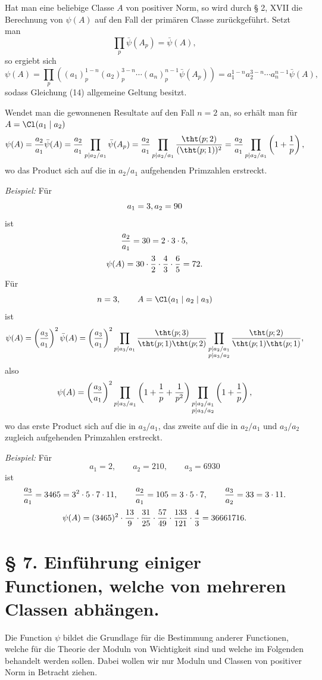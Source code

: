 Hat man eine beliebige Classe $A$ von positiver Norm, so wird durch § 2, XVII die Berechnung von $\psi(A)$ auf den Fall der primären Classe zurückgeführt. Setzt man
\[
 \prod_p\bar\psi(A_p)=\bar\psi(A),
\]
so ergiebt sich
\[
 \psi(A)=\prod_p\left((a_1)_p^{1-n}(a_2)_p^{3-n}\cdots(a_n)_p^{n-1}\bar\psi(A_p)\right)
 =a_1^{1-n}a_2^{3-n}\cdots a_n^{n-1}\bar\psi(A),
\]
sodass Gleichung (14) allgemeine Geltung besitzt.

Wendet man die gewonnenen Resultate auf den Fall $n=2$ an, so erhält man für $A=\Cl(a_1\mid a_2)$
\[
 \psi(A)={a_2\over a_1}\bar\psi(A)
 ={a_2\over a_1}\prod_{p\mid a_2/a_1}\bar\psi(A_p)
 ={a_2\over a_1}\prod_{p\mid a_2/a_1}{\tht(p;2)\over(\tht(p;1))^2}
 ={a_2\over a_1}\prod_{p\mid a_2/a_1}\left(1+{1\over p}\right),
\]
wo das Product sich auf die in $a_2/a_1$ aufgehenden Primzahlen erstreckt.

\emph{Beispiel:} Für
\[
 a_1=3,\\ a_2=90
\]
ist
\[
 {a_2\over a_1}=30=2\cdot3\cdot5,
\]
\[
 \psi(A)=30\cdot {3\over2}\cdot {4\over3}\cdot {6\over5}=72.
\]
Für
\[
 n=3,
 \qquad A=\Cl(a_1\mid a_2\mid a_3)
\]
ist
\[
 \psi(A)=\left({a_3\over a_1}\right)^2\bar\psi(A)
 =\left({a_3\over a_1}\right)^2
 \prod_{p\mid a_3/a_1}{\tht(p;3)\over\tht(p;1)\tht(p;2)}
 \prod_{\substack{p\mid a_2/a_1\\ p\mid a_3/a_2}}
 {\tht(p;2)\over\tht(p;1)\tht(p;1)},
\]
also
\[
 \psi(A)=\left({a_3\over a_1}\right)^2
 \prod_{p\mid a_3/a_1}\left(1+{1\over p}+{1\over p^2}\right)
 \prod_{\substack{p\mid a_2/a_1\\ p\mid a_3/a_2}}
 \left(1+{1\over p}\right),
\]
wo das erste Product sich auf die in $a_3/a_1$, das zweite auf die in $a_2/a_1$ und $a_3/a_2$ zugleich aufgehenden Primzahlen erstreckt.

\emph{Beispiel:} Für
\[
 a_1=2,\qquad a_2=210,\qquad a_3=6930
\]
ist
\[
 {a_3\over a_1}=3465=3^2\cdot5\cdot7\cdot11,
 \qquad {a_2\over a_1}=105=3\cdot5\cdot7,
 \qquad {a_3\over a_2}=33=3\cdot11.
\]
\[
 \psi(A)=(3465)^2\cdot {13\over9}\cdot {31\over25}\cdot {57\over49}\cdot {133\over121}\cdot {4\over3}=36661716.
\]

\section*{§ 7. Einführung einiger Functionen, welche von mehreren Classen abhängen.}

Die Function $\psi$ bildet die Grundlage für die Bestimmung anderer Functionen, welche für die Theorie der Moduln von Wichtigkeit sind und welche im Folgenden behandelt werden sollen. Dabei wollen wir nur Moduln und Classen von positiver Norm in Betracht ziehen.

